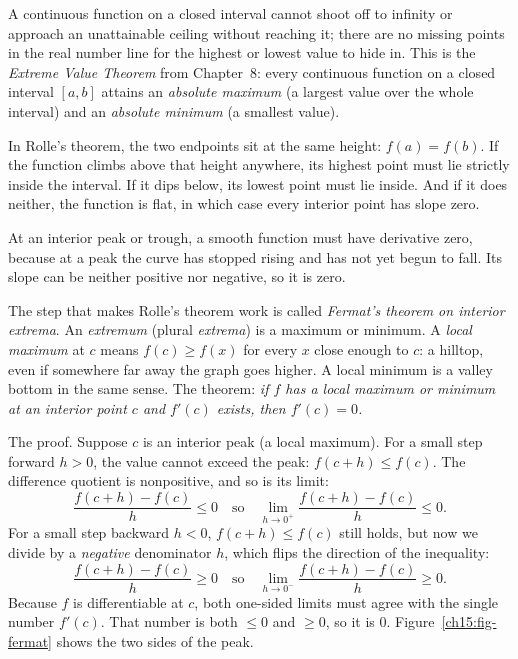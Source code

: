 A continuous
function on a closed interval cannot shoot off to infinity or approach an
unattainable ceiling without reaching it; there are no missing points in the real
number line for the highest or lowest value to hide in. This is the \emph{Extreme
Value Theorem} from Chapter~8: every continuous function on a closed interval
$[a,b]$ attains an \emph{absolute maximum} (a largest value over the whole interval)
and an \emph{absolute minimum} (a smallest value).

In Rolle's theorem, the two endpoints sit at the same
height: $f(a)=f(b)$. If the function climbs above that height anywhere, its highest
point must lie strictly inside the interval. If it
dips below, its lowest point must lie inside. And if it does neither, the function
is flat, in which case every interior point has slope zero.

At an interior peak or trough, a smooth function must have derivative zero, because
at a peak the curve has stopped rising and has not yet begun to fall. Its
slope can be neither positive nor negative, so it is zero.

\begin{whybox}
The step that makes Rolle's theorem work is called
\emph{Fermat's theorem on interior extrema}. An \emph{extremum} (plural
\emph{extrema}) is a maximum or minimum. A \emph{local maximum} at $c$ means
$f(c)\ge f(x)$ for every $x$ close enough to $c$: a hilltop, even if somewhere far
away the graph goes higher. A local minimum is a valley bottom in the same sense. The
theorem: \textit{if $f$ has a local maximum or minimum at an interior
point $c$ and $f'(c)$ exists, then $f'(c)=0$.}

The proof. Suppose $c$ is an interior peak (a local maximum).
For a small step forward $h>0$, the value cannot exceed the peak: $f(c+h)\le f(c)$.
The difference quotient is nonpositive, and so is its limit:
\[
  \frac{f(c+h)-f(c)}{h} \le 0
  \quad\text{so}\quad
  \lim_{h\to 0^+} \frac{f(c+h)-f(c)}{h} \le 0.
\]
For a small step backward $h<0$, $f(c+h)\le f(c)$ still holds, but now we divide by a
\emph{negative} denominator $h$, which flips the direction of the inequality:
\[
  \frac{f(c+h)-f(c)}{h} \ge 0
  \quad\text{so}\quad
  \lim_{h\to 0^-} \frac{f(c+h)-f(c)}{h} \ge 0.
\]
Because $f$ is differentiable at $c$, both one-sided limits must agree with the
single number $f'(c)$. That number is both $\le 0$ and $\ge 0$, so it is $0$.
Figure~\ref{ch15:fig-fermat} shows the two sides of the peak.
\end{whybox}

